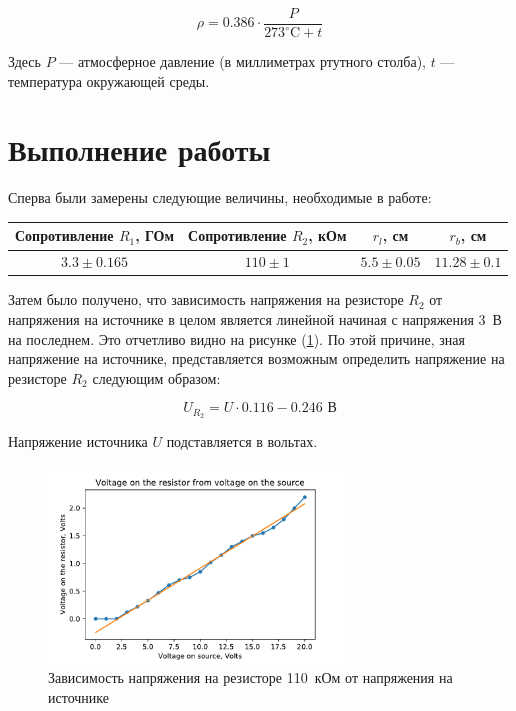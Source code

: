 \documentclass[a4paper, 12pt]{article}
\begin{document}
\begin{equation}
	\rho = 0.386 \cdot \frac{P}{273^\circ \text{C}+ t} %
	\label{Coefficient}
\end{equation}

Здесь $P$ --- атмосферное давление (в миллиметрах ртутного столба), $t$ --- температура окружающей среды.

\section{Выполнение работы}

Сперва были замерены следующие величины, необходимые в работе:

\medspace

\begin{tabular}{|c|c|c|c|}
	\hline 
	Сопротивление $R_1$, ГОм & Сопротивление $R_2$, кОм & $r_l$, см & $r_b$, см \\ 
	\hline 
	$3.3 \pm 0.165 $& $110 \pm 1$   & $5.5 \pm 0.05$ & $11.28 \pm 0.1$ \\ 
	\hline
\end{tabular} 

\medspace

Затем было получено, что зависимость напряжения на резисторе $R_2$ от напряжения на источнике в целом является линейной начиная с напряжения 3~В на последнем. Это отчетливо видно на рисунке (\ref{Voltage_graphic}). По этой причине, зная напряжение на источнике, представляется возможным определить напряжение на резисторе $R_2$ следующим образом:

\begin{equation}
	U_{R_2} =  U \cdot 0.116 - 0.246 \text{  В}
	\label{UR}
\end{equation}

Напряжение источника $U$ подставляется в вольтах.

\begin{figure}[ht!]
	\center
	\includegraphics[width=0.7\textwidth]{Voltage}
	\caption{Зависимость напряжения на резисторе 110~кОм от напряжения на источнике}
	\label{Voltage_graphic}
\end{figure}
\end{document}
